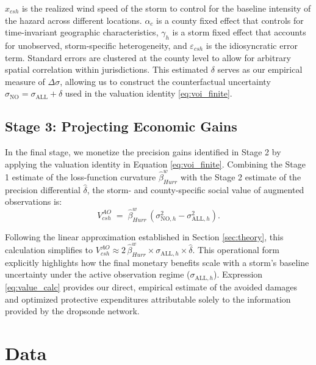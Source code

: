 \documentclass[12pt]{article}%
\begin{document}
$x_{csh}$ is the realized wind speed of the storm to control for the baseline intensity of the hazard across different locations. $\alpha_c$ is a county fixed effect that controls for time-invariant geographic characteristics, $\gamma_h$ is a storm fixed effect that accounts for unobserved, storm-specific heterogeneity, and $\varepsilon_{csh}$ is the idiosyncratic error term. Standard errors are clustered at the county level to allow for arbitrary spatial correlation within jurisdictions. This estimated $\delta$ serves as our empirical measure of $\Delta \sigma$, allowing us to construct the counterfactual uncertainty $\sigma_{\text{NO}} = \sigma_{\text{ALL}} + \delta$ used in the valuation identity \eqref{eq:voi_finite}.

\subsection{Stage 3: Projecting Economic Gains}

In the final stage, we monetize the precision gains identified in Stage 2 by applying the valuation identity in Equation \eqref{eq:voi_finite}. Combining the Stage 1 estimate of the loss-function curvature $\hat{\beta}^w_{Hurr}$ with the Stage 2 estimate of the precision differential $\hat{\delta}$, the storm- and county-specific social value of augmented observations is:
\begin{equation} \label{eq:value_calc}
     V^{AO}_{csh} \;=\; \hat{\beta}^w_{Hurr} \,\left(\sigma_{\text{NO},h}^{2} - \sigma_{\text{ALL},h}^{2}\right).
\end{equation}

Following the linear approximation established in Section \ref{sec:theory}, this calculation simplifies to $V^{AO}_{csh} \approx 2\,\hat{\beta}^w_{Hurr}\times\sigma_{\text{ALL},h}\times\hat{\delta}$. This operational form explicitly highlights how the final monetary benefits scale with a storm's baseline uncertainty under the active observation regime ($\sigma_{\text{ALL},h}$). Expression \eqref{eq:value_calc} provides our direct, empirical estimate of the avoided damages and optimized protective expenditures attributable solely to the information provided by the dropsonde network.


\section{Data} \label{sec:data}
\end{document}
